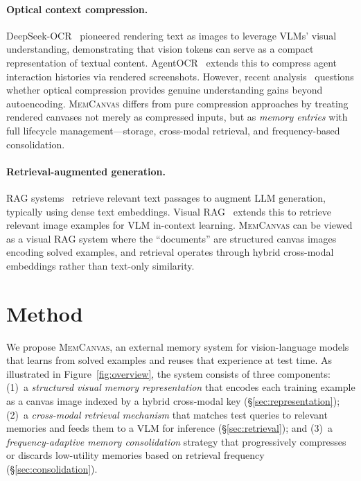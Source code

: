 \documentclass{article}
\newcommand{\memcanvas}{\textsc{MemCanvas}}
\begin{document}
\paragraph{Optical context compression.}
DeepSeek-OCR~\citep{wei2025deepseekocr} pioneered rendering text as images to leverage VLMs' visual understanding, demonstrating that vision tokens can serve as a compact representation of textual content. AgentOCR~\citep{feng2026agentocr} extends this to compress agent interaction histories via rendered screenshots. However, recent analysis~\citep{lee2025opticalcompression} questions whether optical compression provides genuine understanding gains beyond autoencoding. \memcanvas{} differs from pure compression approaches by treating rendered canvases not merely as compressed inputs, but as \emph{memory entries} with full lifecycle management---storage, cross-modal retrieval, and frequency-based consolidation.

\paragraph{Retrieval-augmented generation.}
RAG systems~\citep{lewis2020rag} retrieve relevant text passages to augment LLM generation, typically using dense text embeddings. Visual RAG~\citep{bonomo2025visualrag} extends this to retrieve relevant image examples for VLM in-context learning. \memcanvas{} can be viewed as a visual RAG system where the ``documents'' are structured canvas images encoding solved examples, and retrieval operates through hybrid cross-modal embeddings rather than text-only similarity.

\section{Method}
\label{sec:method}

We propose \memcanvas{}, an external memory system for vision-language models that learns from solved examples and reuses that experience at test time. As illustrated in Figure~\ref{fig:overview}, the system consists of three components: (1)~a \emph{structured visual memory representation} that encodes each training example as a canvas image indexed by a hybrid cross-modal key (\S\ref{sec:representation}); (2)~a \emph{cross-modal retrieval mechanism} that matches test queries to relevant memories and feeds them to a VLM for inference (\S\ref{sec:retrieval}); and (3)~a \emph{frequency-adaptive memory consolidation} strategy that progressively compresses or discards low-utility memories based on retrieval frequency (\S\ref{sec:consolidation}).
\end{document}
